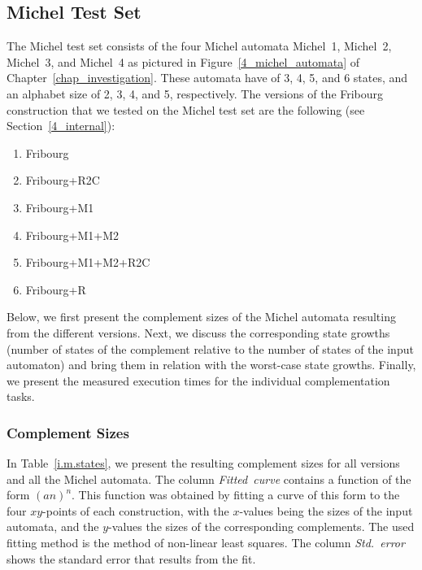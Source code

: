 


\subsection{Michel Test Set}
\label{5_internal_michel}
The Michel test set consists of the four Michel automata Michel~1, Michel~2, Michel~3, and Michel~4 as pictured in Figure~\ref{4_michel_automata} of Chapter~\ref{chap_investigation}. These automata have of 3, 4, 5, and 6 states, and an alphabet size of 2, 3, 4, and 5, respectively. The versions of the Fribourg construction that we tested on the Michel test set are the following (see Section~\ref{4_internal}):

\begin{enumerate}
\item Fribourg
\item Fribourg+R2C
\item Fribourg+M1
\item Fribourg+M1+M2
\item Fribourg+M1+M2+R2C
\item Fribourg+R
\end{enumerate}

Below, we first present the complement sizes of the Michel automata resulting from the different versions. Next, we discuss the corresponding state growths (number of states of the complement relative to the number of states of the input automaton) and bring them in relation with the worst-case state growths. Finally, we present the measured execution times for the individual complementation tasks. 

\subsubsection{Complement Sizes}
In Table~\ref{i.m.states}, we present the resulting complement sizes for all versions and all the Michel automata. The column \textit{Fitted~curve} contains a function of the form $(an)^n$. This function was obtained by fitting a curve of this form to the four $xy$-points of each construction, with the $x$-values being the sizes of the input automata, and the $y$-values the sizes of the corresponding complements. The used fitting method is the method of non-linear least squares. The column \textit{Std.~error} shows the standard error that results from the fit.

